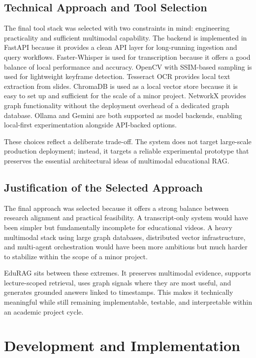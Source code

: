 \documentclass[12pt,a4paper,oneside]{report}
\begin{document}
\section{Technical Approach and Tool Selection}
The final tool stack was selected with two constraints in mind: engineering practicality and sufficient multimodal capability. The backend is implemented in FastAPI because it provides a clean API layer for long-running ingestion and query workflows. Faster-Whisper is used for transcription because it offers a good balance of local performance and accuracy. OpenCV with SSIM-based sampling is used for lightweight keyframe detection. Tesseract OCR provides local text extraction from slides. ChromaDB is used as a local vector store because it is easy to set up and sufficient for the scale of a minor project. NetworkX provides graph functionality without the deployment overhead of a dedicated graph database. Ollama and Gemini are both supported as model backends, enabling local-first experimentation alongside API-backed options.

These choices reflect a deliberate trade-off. The system does not target large-scale production deployment; instead, it targets a reliable experimental prototype that preserves the essential architectural ideas of multimodal educational RAG.

\section{Justification of the Selected Approach}
The final approach was selected because it offers a strong balance between research alignment and practical feasibility. A transcript-only system would have been simpler but fundamentally incomplete for educational videos. A heavy multimodal stack using large graph databases, distributed vector infrastructure, and multi-agent orchestration would have been more ambitious but much harder to stabilize within the scope of a minor project.

EduRAG sits between these extremes. It preserves multimodal evidence, supports lecture-scoped retrieval, uses graph signals where they are most useful, and generates grounded answers linked to timestamps. This makes it technically meaningful while still remaining implementable, testable, and interpretable within an academic project cycle.

\chapter{Development and Implementation}
\end{document}
